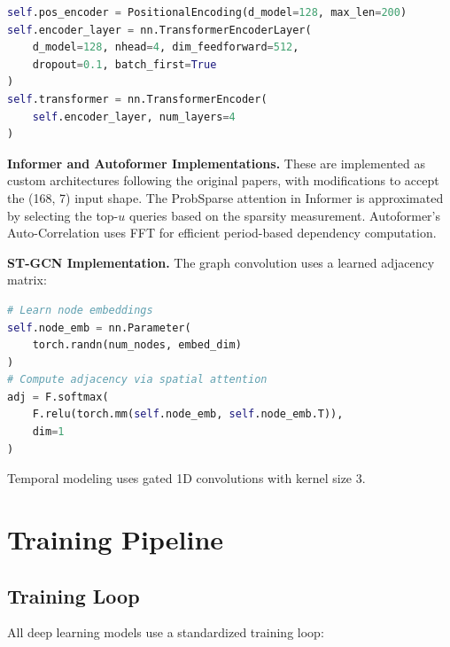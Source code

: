 \begin{lstlisting}[language=Python]
self.pos_encoder = PositionalEncoding(d_model=128, max_len=200)
self.encoder_layer = nn.TransformerEncoderLayer(
    d_model=128, nhead=4, dim_feedforward=512,
    dropout=0.1, batch_first=True
)
self.transformer = nn.TransformerEncoder(
    self.encoder_layer, num_layers=4
)
\end{lstlisting}

\textbf{Informer and Autoformer Implementations.} These are implemented as custom architectures following the original papers, with modifications to accept the (168, 7) input shape. The ProbSparse attention in Informer is approximated by selecting the top-$u$ queries based on the sparsity measurement. Autoformer's Auto-Correlation uses FFT for efficient period-based dependency computation.

\textbf{ST-GCN Implementation.} The graph convolution uses a learned adjacency matrix:

\begin{lstlisting}[language=Python]
# Learn node embeddings
self.node_emb = nn.Parameter(
    torch.randn(num_nodes, embed_dim)
)
# Compute adjacency via spatial attention
adj = F.softmax(
    F.relu(torch.mm(self.node_emb, self.node_emb.T)),
    dim=1
)
\end{lstlisting}

Temporal modeling uses gated 1D convolutions with kernel size 3.

\section{Training Pipeline}

\subsection{Training Loop}

All deep learning models use a standardized training loop:

